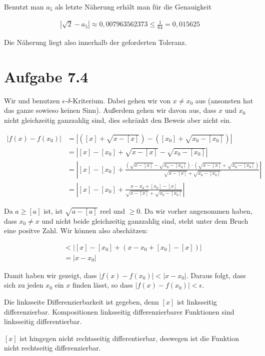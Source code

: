 \documentclass[a4paper,german,12pt,smallheadings]{scrartcl}
\begin{document}
Benutzt man $a_5$ als letzte Näherung erhält man für die Genauigkeit

\begin{align*}
  |\sqrt{2} - a_5| \approx 0{,}007963562373 \le \frac{1}{64} = 0{,}015625
\end{align*}

Die Näherung liegt also innerhalb der geforderten Toleranz.

\section*{Aufgabe 7.4}

Wir und benutzen $\epsilon$-$\delta$-Kriterium. Dabei gehen wir von $x \neq
x_0$ aus (ansonsten hat das ganze sowieso keinen Sinn). Außerdem gehen wir
davon aus, dass $x$ und $x_0$ nicht gleichzeitig ganzzahlig sind, dies schränkt
den Beweis aber nicht ein.

\begin{align*}
  |f(x) - f(x_0)| &= \left|([x] + \sqrt{x-[x]}) - ([x_0] + \sqrt{x_0 - [x_0]})\right| \\
                  &= \left|[x] - [x_0] + \sqrt{x-[x]} - \sqrt{x_0 - [x_0]}\right| \\
                  &= \left|[x] - [x_0] + \frac{(\sqrt{x-[x]} - \sqrt{x_0 - [x_0]}) \cdot (\sqrt{x-[x]} + \sqrt{x_0 - [x_0]})}{\sqrt{x-[x]} + \sqrt{x_0 - [x_0]}}\right| \\
                  &= \left|[x] - [x_0] + \frac{x-x_0+[x_0]-[x]}{\sqrt{x-[x]} + \sqrt{x_0 - [x_0]}}\right|
\end{align*}

Da $a \ge [a]$ ist, ist $\sqrt{a - [a]}$ reel und $\ge 0$. Da wir vorher
angenommen haben, dass $x_0 \neq x$ und nicht beide gleichzeitig ganzzahlig
sind, steht unter dem Bruch eine positve Zahl. Wir können also abschätzen:

\begin{align*}
  &< \left|[x] - [x_0] + (x-x_0+[x_0]-[x])\right| \\
  &= \left|x-x_0\right|
\end{align*}

Damit haben wir gezeigt, dass $|f(x) - f(x_0)| < |x-x_0|$. Daraus folgt, dass sich
zu jeden $x_0$ ein $x$ finden lässt, so dass $|f(x) - f(x_0)| < \epsilon$.

Die linksseite Differenzierbarkeit ist gegeben, denn $[x]$ ist linksseitig
differenzierbar. Kompositionen linksseitig differenzierbarer Funktionen sind
linksseitig differentierbar.

$[x]$ ist hingegen nicht rechtsseitig differentierbar, deswegen ist die
Funktion nicht rechtseitig differenzierbar.
\end{document}
